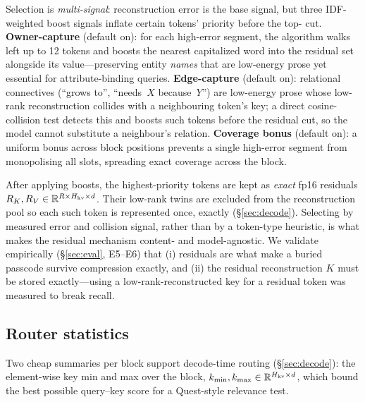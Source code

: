 Selection is \emph{multi-signal}: reconstruction error is the base signal, but three
IDF-weighted boost signals inflate certain tokens' priority before the top-\maxres{} cut.
\textbf{Owner-capture} (default on): for each high-error segment, the algorithm walks left up
to 12 tokens and boosts the nearest capitalized word into the residual set alongside its
value---preserving entity \emph{names} that are low-energy prose yet essential for
attribute-binding queries. \textbf{Edge-capture} (default on): relational connectives
(``grows to'', ``needs~$X$ because~$Y$'') are low-energy prose whose low-rank reconstruction
collides with a neighbouring token's key; a direct cosine-collision test detects this and
boosts such tokens before the residual cut, so the model cannot substitute a neighbour's
relation. \textbf{Coverage bonus} (default on): a uniform bonus across block positions prevents
a single high-error segment from monopolising all \maxres{} slots, spreading exact coverage
across the block.

After applying boosts, the \maxres{} highest-priority tokens are kept as \emph{exact} fp16
residuals $R_K,R_V\in\mathbb{R}^{R\times H_{\mathrm{kv}}\times d}$. Their low-rank twins are excluded
from the reconstruction pool so each such token is represented once, exactly
(\S\ref{sec:decode}). Selecting by measured error and collision signal, rather than by a
token-type heuristic, is what makes the residual mechanism content- and model-agnostic. We
validate empirically (\S\ref{sec:eval}, E5--E6) that (i) residuals are what make a buried
passcode survive compression exactly, and (ii) the residual reconstruction $K$ must be stored
exactly---using a low-rank-reconstructed key for a residual token was measured to break recall.


\subsection{Router statistics}
Two cheap summaries per block support decode-time routing (\S\ref{sec:decode}): the element-wise
key min and max over the block, $k_{\min},k_{\max}\in\mathbb{R}^{H_{\mathrm{kv}}\times d}$, which bound the best
possible query--key score for a Quest-style relevance test.

